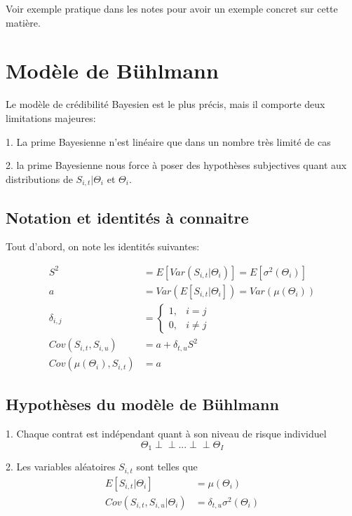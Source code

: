 \documentclass[11pt,french]{report}
\begin{document}
Voir exemple pratique dans les notes pour avoir un exemple concret sur cette matière.

\section{Modèle de Bühlmann } 

Le modèle de crédibilité Bayesien est le plus précis, mais il comporte deux limitations majeures:

1. La prime Bayesienne n'est linéaire que dans un nombre très limité de cas

2. la prime Bayesienne nous force à poser des hypothèses subjectives quant aux distributions de $S_{i,t}|\Theta_i$ et $\Theta_i$.

\subsection{ Notation et identités à connaitre}

Tout d'abord, on note les identités suivantes:

$$\boxed{\begin{aligned} 
S^2 &= E[Var(S_{i,t}|\Theta_i)] = E[\sigma^2(\Theta_i)] \\
a &= Var(E[S_{i,t}|\Theta_i]) = Var(\mu(\Theta_i)) \\
    \delta_{i,j}&= 
\begin{cases}
    1,    & i=j\\
    0,    & i\neq j
\end{cases}
 \\
Cov(S_{i,t},S_{i,u})  &=a + \delta_{t,u}S^2 \\
Cov(\mu(\Theta_i),S_{i,t}) &=a 
\end{aligned}}$$

\subsection{ Hypothèses du modèle de Bühlmann}

1. Chaque contrat est indépendant quant à son niveau de risque individuel
$$\Theta_1 {\perp\!\!\!\perp} ... {\perp\!\!\!\perp} \Theta_I$$

2. Les variables aléatoires $S_{i,t}$ sont telles que
$$\begin{aligned}
E[S_{i,t}|\Theta_i] &= \mu(\Theta_i) \\
Cov(S_{i,t},S_{i,u}|\Theta_i) &= \delta_{t,u} \sigma^2(\Theta_i)
\end{aligned}$$
 
\end{document}
